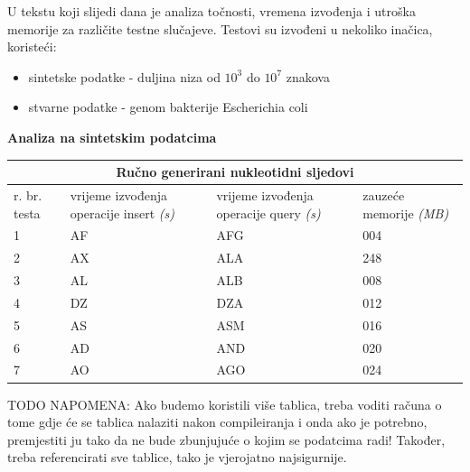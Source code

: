\documentclass[times, utf8, seminar, numeric]{fer}
\begin{document}
U tekstu koji slijedi dana je analiza točnosti, vremena izvođenja i utroška memorije za različite testne slučajeve. Testovi su izvođeni u nekoliko inačica, koristeći:
\begin{itemize}

  \item {sintetske podatke - duljina niza od $10^3$ do $10^7$ znakova}
  \item {stvarne podatke - genom bakterije Escherichia coli}

\end{itemize}


\begin{flushleft}
\textbf{Analiza na sintetskim podatcima}
\end{flushleft}

\begin{tabular}
{ |p{0.8cm}||p{4cm}|p{4cm}|p{4cm}|  }
 \hline
 \multicolumn{4}{|c|}{Ručno generirani nukleotidni sljedovi} \\
 \hline
 r. br. testa& vrijeme izvođenja operacije insert \textit{(s)} & vrijeme izvođenja operacije query \textit{(s)} &zauzeće memorije \textit{(MB)}\\
 \hline
 1& AF    &AFG&   004\\
 2&   AX  & ALA   &248\\
 3&AL & ALB&  008\\
 4&DZ & DZA&  012\\
 5&   AS  & ASM&016\\
 6& AD  & AND   &020\\
 7& AO  & AGO&024\\
 \hline
\end{tabular}

\vspace{10mm} 

TODO NAPOMENA: Ako budemo koristili više tablica, treba voditi računa o tome gdje će se tablica nalaziti nakon compileiranja i onda ako je potrebno, premjestiti ju tako da ne bude zbunjujuće o kojim se podatcima radi! Također, treba referencirati sve tablice, tako je vjerojatno najsigurnije.
\end{document}
